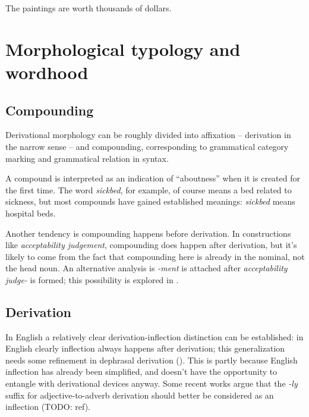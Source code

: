 \documentclass[UTF8, a4paper, oneside, scheme=plain, 12pt]{ctexbook}
\newcommand{\form}[1]{\emph{#1}}
\begin{document}
\begin{exe}
    \ex The paintings are worth thousands of dollars.
\end{exe}

\section{Morphological typology and wordhood}\label{sec:pos.morphology}


\subsection{Compounding}\label{sec:pos.overview.derivation.compound}

Derivational morphology can be roughly divided into 
affixation -- derivation in the narrow sense -- and compounding,
corresponding to grammatical category marking and grammatical relation in syntax.


A compound is interpreted as an indication of ``aboutness''
when it is created for the first time.
The word \form{sickbed}, 
for example, of course means a bed related to sickness,
but most compounds have gained established meanings:
\form{sickbed} means hospital beds.

Another tendency is compounding happens before derivation.
In constructions like \form{acceptability judgement},
compounding does happen after derivation,
but it's likely to come from the fact that 
compounding here is already in the nominal,
not the head noun.
An alternative analysis is \form{-ment} is attached after 
\form{acceptability judge-} is formed; 
this possibility is explored in .

\subsection{Derivation}\label{sec:pos.overview.derivation.derivation}

In English a relatively clear derivation-inflection distinction can be established:
in English clearly inflection always happens after derivation;
this generalization needs some refinement in dephrasal derivation ().
This is partly because English inflection has already been simplified,
and doesn't have the opportunity to entangle with derivational devices anyway.
Some recent works argue that the \form{-ly} suffix for adjective-to-adverb derivation 
should better be considered as an inflection (TODO: ref).
\end{document}
